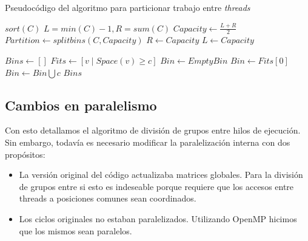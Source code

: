 \begin{algorithm}[H]
    \caption{Pseudoc\'odigo del algoritmo para particionar trabajo entre \textit{threads}}
    \label{algo:partition-algo}
    \begin{algorithmic}
            \State $sort(C)$
            \State $L = min(C)-1, R = sum(C)$
                \Comment{Invariante: $(L, \dots, R]$ contiene la capacidad maxima.}
                \State $Capacity \gets \frac{L+R}{2}$
                \State $Partition \gets splitbins(C,Capacity)$
                    \State $R \gets Capacity$
                \Else
                    \State $L \gets Capacity$
                \EndIf
            \EndWhile

            \State {}
        \EndFunction

            \State $Bins \gets []$
                \State $Fits \gets [v \mid Space(v) \geq c]$
                    \State $Bin \gets EmptyBin$
                \Else
                    \State $Bin \gets Fits[0]$
                \EndIf 
                \State $Bin \gets Bin \bigcup c$
            \EndFor
            \State \Return $Bins$
        \EndFunction
    \end{algorithmic}
\end{algorithm}

\subsection{Cambios en paralelismo}

Con esto detallamos el algoritmo de divisi\'on de grupos entre hilos de ejecuci\'on.
Sin embargo, todav\'ia es necesario modificar la paralelizaci\'on interna con dos
prop\'ositos:

\begin{itemize}
    \item La versi\'on original del c\'odigo actualizaba matrices globales. Para
    la divisi\'on de grupos entre si esto es indeseable porque requiere que los
    accesos entre threads a posiciones comunes sean coordinados. 
    \item Los ciclos originales no estaban paralelizados. Utilizando OpenMP 
    hicimos que los mismos sean paralelos.
\end{itemize}

